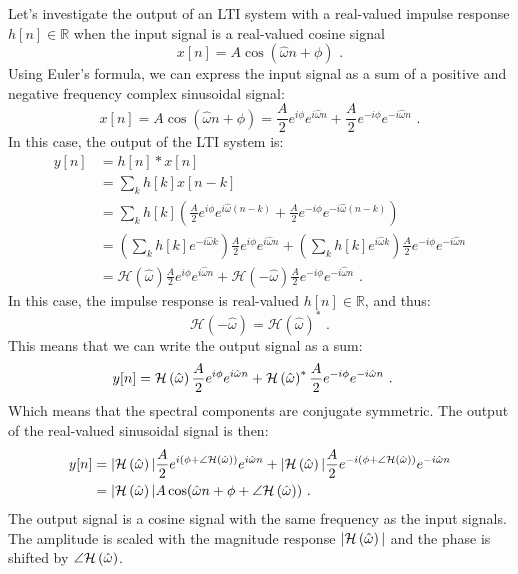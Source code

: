 Let's investigate the output of an LTI system with a real-valued
impulse response $h[n]\in\mathbb{R}$ when the input signal is a real-valued cosine signal
\begin{equation}
x[n] = A\cos(\hat{\omega} n + \phi)\,\,.
\end{equation}
Using Euler's formula, we can express the input signal as a sum of a
positive and negative frequency complex sinusoidal signal:
\begin{equation}
x[n] = A \cos(\hat{\omega} n + \phi) = \frac{A}{2}e^{i\phi}e^{i\hat{\omega} n} + \frac{A}{2}e^{-i\phi}e^{-i\hat{\omega} n}\,\,.
\end{equation}
In this case, the output of the LTI system is:
\begin{align}
y[n] &= h[n]*x[n]\\
&= \sum_{k} h[k]x[n-k]\\
&= \sum_{k} h[k] \left( \frac{A}{2}e^{i\phi}e^{i\hat{\omega} (n-k)} + \frac{A}{2}e^{-i\phi}e^{-i\hat{\omega} (n-k)} \right)\\
 &= \left(\sum_{k} h[k] e^{-i\hat{\omega} k}\right) \frac{A}{2}e^{i\phi}e^{i\hat{\omega} n} + \left(\sum_{k} h[k] e^{i\hat{\omega} k}\right) \frac{A}{2}e^{-i\phi} e^{-i\hat{\omega} n}\\
 &= \mathcal{H}(\hat{\omega}) \frac{A}{2}e^{i\phi}e^{i\hat{\omega} n} + \mathcal{H}(-\hat{\omega}) \frac{A}{2}e^{-i\phi}e^{-i\hat{\omega} n}\,\,.
 \end{align} 
In this case, the impulse response is real-valued $h[n]\in \mathbb{R}$, and thus:
\begin{equation}
\mathcal{H}(-\hat{\omega}) = \mathcal{H}(\hat{\omega})^*\,\,.
\end{equation}
This means that we can write the output signal as a sum:
\begin{align}
y[n] &= \mathcal{H}\left(\hat{\omega}\right) \frac{A}{2}e^{i\phi}e^{i\hat{\omega} n} +  \mathcal{H}\left(\hat{\omega}\right)^*\frac{A}{2}e^{-i\phi} e^{-i\hat{\omega} n}\,\,.
\end{align}
Which means that the spectral components are conjugate symmetric. The output of the real-valued sinusoidal signal is then:
\begin{align}
y[n] &= |\mathcal{H}\left(\hat{\omega}\right)|\frac{A}{2} e^{i(\phi + \angle \mathcal{H}\left(\hat{\omega}\right))}e^{i\hat{\omega} n} + |\mathcal{H}\left(\hat{\omega}\right)|\frac{A}{2}e^{-i(\phi + \angle \mathcal{H}\left(\hat{\omega}\right))} e^{-i\hat{\omega} n} \\
 & = |\mathcal{H}\left(\hat{\omega}\right)| A \cos(\hat{\omega} n + \phi + \angle \mathcal{H}\left(\hat{\omega}\right))\,\,.
\end{align}
The output signal is a cosine signal with the same frequency as the
input signals. The amplitude is scaled with the magnitude response
$|\mathcal{H}\left(\hat{\omega}\right)|$ and the phase is shifted by $\angle \mathcal{H}\left(\hat{\omega}\right)$.

